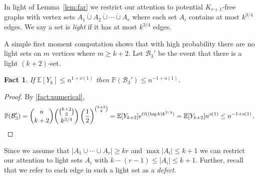 \documentclass[11pt]{article}
\newtheorem{fact}[theorem]{Fact}
\theoremstyle{definition}
\theoremstyle{remark}
\newcommand{\EE}{\mathbb{E}}
\newcommand{\E}{\mathbb{E}}
\newcommand{\PP}{\mathbb{P}}
\newcommand{\cB}{\mathcal{B}}
\begin{document}
In light of Lemma~\ref{lem:far} we restrict our attention to potential $K_{r+1}$-free graphs
with vertex sets $ A_1 \dot\cup A_2 \dot\cup \dotsm \dot\cup A_r$ where each set $A_i$ contains
at most $ k^{3/4}$ edges.  We say a set is \emph{light} if it has at most $k^{3/4}$ edges.  


A simple first moment computation shows that with high probability there are no light sets on $m$ vertices where $m \ge k+2$.  Let $\cB_3'$ be the event that there is a light $(k+2)$-set.

\begin{fact}\label{fact:no-light-k+2}
    If $\E [Y_k] \leq n^{1 + o(1)}$ then $\PP(\cB_3') \leq n^{-1 + o(1)}$.  
\end{fact}
\begin{proof}
    By \cref{fact:numerical},  \[ \PP(\cB_3') =\binom{n}{k+2} \binom{ \binom{k+2}{2}}{ k^{3/4}} \left( \frac12 \right)^{ \binom{k+2}{2}} 
= \EE[ Y_{k+2}] e^{ O( (\log k) k^{3/4}) } = \EE[ Y_{k+2}] n^{o(1)} \leq n^{-1 + o(1)} \,. \qedhere\]
\end{proof}


Since we assume that $|A_1 \cup \cdots \cup A_r| \ge kr$ and $\max |A_i| \le  k+1$ we  can restrict our attention to light sets $A_i$ with $ k -(r-1) \le |A_i| \le k+1$.  Further, recall that we refer to each edge in such a light set as
a \emph{defect}.
\end{document}
